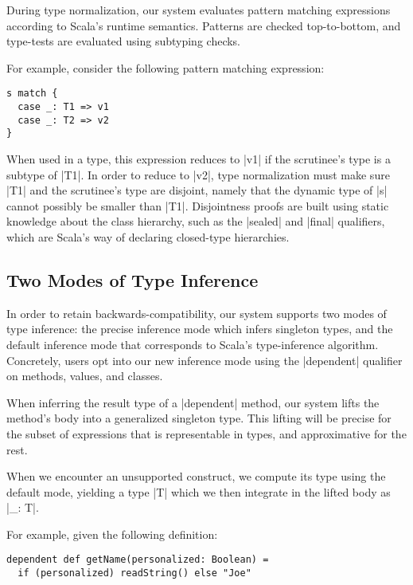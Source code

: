 During type normalization, our system evaluates pattern matching expressions according to Scala's runtime semantics.
Patterns are checked top-to-bottom, and type-tests are evaluated using subtyping checks.

For example, consider the following pattern matching expression:

\begin{lstlisting}
s match {
  case _: T1 => v1
  case _: T2 => v2
}
\end{lstlisting}

\noindent
When used in a type, this expression reduces to |v1| if the scrutinee's type is a subtype of |T1|.
In order to reduce to |v2|, type normalization must make sure |T1| and the scrutinee's type are disjoint, namely that the dynamic type of |s| cannot possibly be smaller than |T1|.
Disjointness proofs are built using static knowledge about the class hierarchy, such as the |sealed| and |final| qualifiers, which are Scala's way of declaring closed-type hierarchies.

\subsection{Two Modes of Type Inference}

In order to retain backwards-compatibility, our system supports two modes of type inference: the precise inference mode which infers singleton types, and the default inference mode that corresponds to Scala's type-inference algorithm.
Concretely, users opt into our new inference mode using the |dependent| qualifier on methods, values, and classes.

When inferring the result type of a |dependent| method, our system lifts the method's body into a generalized singleton type.
This lifting will be precise for the subset of expressions that is representable in types, and approximative for the rest.
\begin{diff}
When we encounter an unsupported construct, we compute its type using the default mode, yielding a type |T| which we then integrate in the lifted body as |_: T|\footnotemark.
\end{diff}

For example, given the following definition:

\begin{lstlisting}
dependent def getName(personalized: Boolean) =
  if (personalized) readString() else "Joe"
\end{lstlisting}

